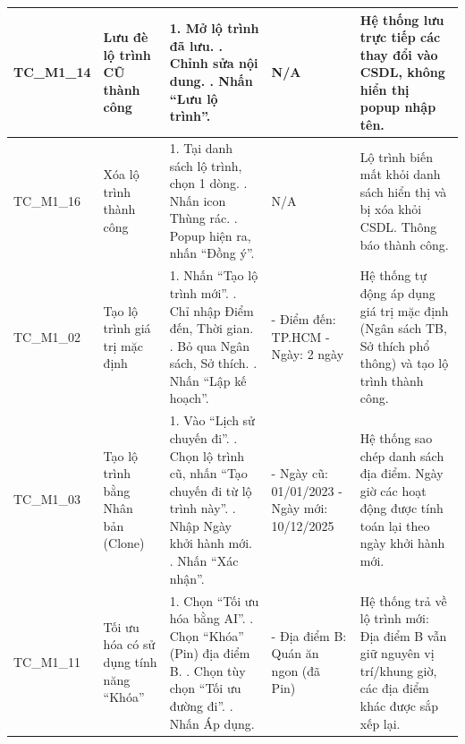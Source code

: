 \begin{landscape}
\begin{longtable}{|p{2.5cm}|p{4.0cm}|p{6.5cm}|p{4.5cm}|p{4.5cm}|}
TC\_M1\_14 & Lưu đè lộ trình CŨ thành công & 
1. Mở lộ trình đã lưu. \newline 
2. Chỉnh sửa nội dung. \newline 
3. Nhấn ``Lưu lộ trình''. & 
N/A & 
Hệ thống lưu trực tiếp các thay đổi vào CSDL, không hiển thị popup nhập tên. \\
\hline

TC\_M1\_16 & Xóa lộ trình thành công & 
1. Tại danh sách lộ trình, chọn 1 dòng. \newline 
2. Nhấn icon Thùng rác. \newline 
3. Popup hiện ra, nhấn ``Đồng ý''. & 
N/A & 
Lộ trình biến mất khỏi danh sách hiển thị và bị xóa khỏi CSDL. Thông báo thành công. \\
\hline

TC\_M1\_02 & Tạo lộ trình giá trị mặc định & 
1. Nhấn ``Tạo lộ trình mới''. \newline 
2. Chỉ nhập Điểm đến, Thời gian. \newline 
3. Bỏ qua Ngân sách, Sở thích. \newline 
4. Nhấn ``Lập kế hoạch''. & 
- Điểm đến: TP.HCM \newline 
- Ngày: 2 ngày & 
Hệ thống tự động áp dụng giá trị mặc định (Ngân sách TB, Sở thích phổ thông) và tạo lộ trình thành công. \\
\hline

TC\_M1\_03 & Tạo lộ trình bằng Nhân bản (Clone) & 
1. Vào ``Lịch sử chuyến đi''. \newline 
2. Chọn lộ trình cũ, nhấn ``Tạo chuyến đi từ lộ trình này''. \newline 
3. Nhập Ngày khởi hành mới. \newline 
4. Nhấn ``Xác nhận''. & 
- Ngày cũ: 01/01/2023 \newline 
- Ngày mới: 10/12/2025 & 
Hệ thống sao chép danh sách địa điểm. Ngày giờ các hoạt động được tính toán lại theo ngày khởi hành mới. \\
\hline

TC\_M1\_11 & Tối ưu hóa có sử dụng tính năng ``Khóa'' & 
1. Chọn ``Tối ưu hóa bằng AI''. \newline 
2. Chọn ``Khóa'' (Pin) địa điểm B. \newline 
3. Chọn tùy chọn ``Tối ưu đường đi''. \newline 
4. Nhấn Áp dụng. & 
- Địa điểm B: Quán ăn ngon (đã Pin) & 
Hệ thống trả về lộ trình mới: Địa điểm B vẫn giữ nguyên vị trí/khung giờ, các địa điểm khác được sắp xếp lại. \\
\hline


\end{longtable}
\end{landscape}
